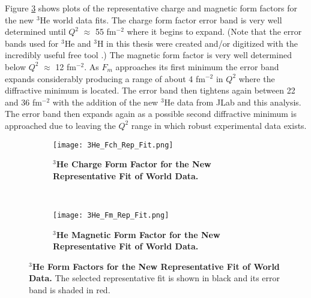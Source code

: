 Figure \ref{fig:3he_rep_fit} shows plots of the representative charge and magnetic form factors for the new $^3$He world data fits. The charge form factor error band is very well determined until $Q^2$ $\approx$ 55 fm$^{-2}$ where it begins to expand. (Note that the error bands used for $^3$He and $^3$H in this thesis were created and/or digitized with the incredibly useful free tool \cite{web_plot_digitizer}.) The magnetic form factor is very well determined below  $Q^2$ $\approx$ 12 fm$^{-2}$. As $F_m$ approaches its first minimum the error band expands considerably producing a range of about 4 fm$^{-2}$ in $Q^2$ where the diffractive minimum is located. The error band then tightens again between 22 and 36 fm$^{-2}$ with the addition of the new $^3$He data from JLab and this analysis. The error band then expands again as a possible second diffractive minimum is approached due to leaving the $Q^2$ range in which robust experimental data exists. 

\begin{figure}[!ht]
\begin{subfigure}{1.\textwidth}
  \centering
  \texttt{[image: 3He\_Fch\_Rep\_Fit.png]}
  \caption{\bf{$^3$He Charge Form Factor for the New Representative Fit of World Data.}}
  \label{fig:3he_fch_rep_fit}
\end{subfigure}\\
\begin{subfigure}{1.\textwidth}
  \centering
  \texttt{[image: 3He\_Fm\_Rep\_Fit.png]}
  \caption{\bf{$^3$He Magnetic Form Factor for the New Representative Fit of World Data.}}
  \label{fig:3he_fm_rep_fit}
\end{subfigure}
\caption[$^3$He Form Factors for the New Representative Fit of World Data] {
{\bf{$^3$He Form Factors for the New Representative Fit of World Data.}} The selected representative fit is shown in black and its error band is shaded in red.}
\label{fig:3he_rep_fit}
\end{figure}

